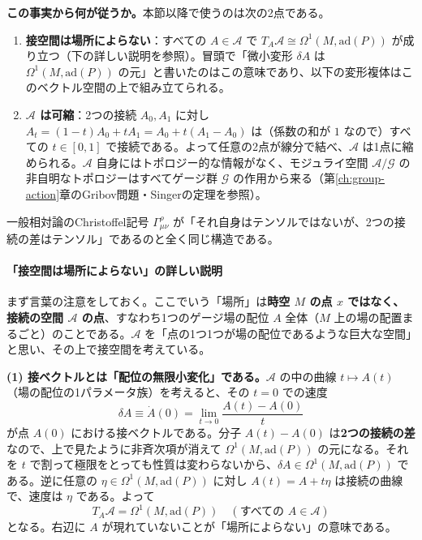 \documentclass[uplatex, dvipdfmx, book]{jsbook}
\begin{document}
\textbf{この事実から何が従うか。}本節以降で使うのは次の2点である。
\begin{enumerate}
    \item \textbf{接空間は場所によらない}：すべての $A \in \mathcal{A}$ で $T_A\mathcal{A} \cong \Omega^1(M, \mathrm{ad}(P))$ が成り立つ（下の詳しい説明を参照）。冒頭で「微小変形 $\delta A$ は $\Omega^1(M,\mathrm{ad}(P))$ の元」と書いたのはこの意味であり、以下の変形複体はこのベクトル空間の上で組み立てられる。
    \item \textbf{$\mathcal{A}$ は可縮}：2つの接続 $A_0, A_1$ に対し $A_t = (1-t)A_0 + tA_1 = A_0 + t(A_1 - A_0)$ は（係数の和が $1$ なので）すべての $t \in [0,1]$ で接続である。よって任意の2点が線分で結べ、$\mathcal{A}$ は1点に縮められる。$\mathcal{A}$ 自身にはトポロジー的な情報がなく、モジュライ空間 $\mathcal{A}/\mathcal{G}$ の非自明なトポロジーはすべてゲージ群 $\mathcal{G}$ の作用から来る（第\ref{ch:group-action}章のGribov問題・Singerの定理を参照）。
\end{enumerate}
一般相対論のChristoffel記号 $\Gamma^\rho_{\mu\nu}$ が「それ自身はテンソルではないが、2つの接続の差はテンソル」であるのと全く同じ構造である。

\paragraph{「接空間は場所によらない」の詳しい説明}
まず言葉の注意をしておく。ここでいう「場所」は\textbf{時空 $M$ の点 $x$ ではなく、接続の空間 $\mathcal{A}$ の点}、すなわち1つのゲージ場の配位 $A$ 全体（$M$ 上の場の配置まるごと）のことである。$\mathcal{A}$ を「点の1つ1つが場の配位であるような巨大な空間」と思い、その上で接空間を考えている。

\textbf{(1) 接ベクトルとは「配位の無限小変化」である。}$\mathcal{A}$ の中の曲線 $t \mapsto A(t)$（場の配位の1パラメータ族）を考えると、その $t = 0$ での速度
\begin{equation*}
    \delta A \equiv \dot A(0) = \lim_{t\to 0}\frac{A(t) - A(0)}{t}
\end{equation*}
が点 $A(0)$ における接ベクトルである。分子 $A(t) - A(0)$ は\textbf{2つの接続の差}なので、上で見たように非斉次項が消えて $\Omega^1(M, \mathrm{ad}(P))$ の元になる。それを $t$ で割って極限をとっても性質は変わらないから、$\delta A \in \Omega^1(M, \mathrm{ad}(P))$ である。逆に任意の $\eta \in \Omega^1(M,\mathrm{ad}(P))$ に対し $A(t) = A + t\eta$ は接続の曲線で、速度は $\eta$ である。よって
\begin{equation*}
    T_A\mathcal{A} = \Omega^1(M, \mathrm{ad}(P)) \quad (\text{すべての } A \in \mathcal{A})
\end{equation*}
となる。右辺に $A$ が現れていないことが「場所によらない」の意味である。
\end{document}
